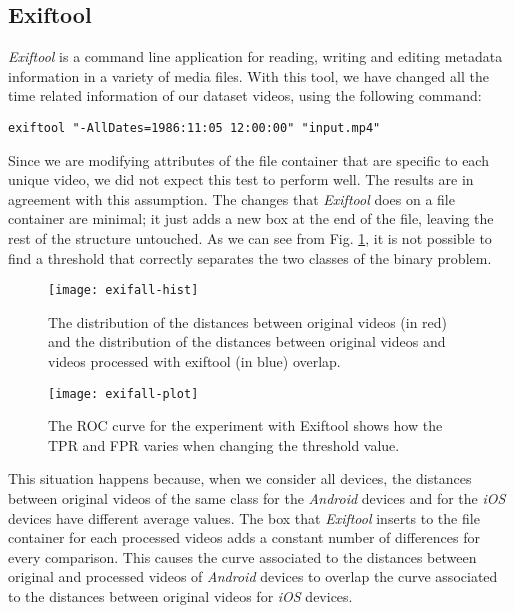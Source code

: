 \subsection{Exiftool}

\emph{Exiftool} is a command line application for reading, writing and editing metadata information in a variety of media files. With this tool, we have changed all the time related information of our dataset videos, using the following command:

\begin{lstlisting}
exiftool "-AllDates=1986:11:05 12:00:00" "input.mp4"
\end{lstlisting}

Since we are modifying attributes of the file container that are specific to each unique video, we did not expect this test to perform well. The results are in agreement with this assumption. The changes that \emph{Exiftool} does on a file container are minimal; it just adds a new box at the end of the file, leaving the rest of the structure untouched. As we can see from Fig. \ref{fig:exifaal-hist}, it is not possible to find a threshold that correctly separates the two classes of the binary problem.

\begin{figure}
  \centering
  \texttt{[image: exifall-hist]}
  \caption{The distribution of the distances between original videos (in red) and the distribution of the distances between original videos and videos processed with exiftool (in blue) overlap.}\label{fig:exifaal-hist}
\end{figure}

\begin{figure}
  \centering
  \texttt{[image: exifall-plot]}
  \caption{The ROC curve for the experiment with Exiftool shows how the TPR and FPR varies when changing the threshold value.}\label{fig:brand-roc}
\end{figure}

This situation happens because, when we consider all devices, the distances between original videos of the same class for the \emph{Android} devices and for the \emph{iOS} devices have different average values. The box that \emph{Exiftool} inserts to the file container for each processed videos adds a constant number of differences for every comparison. This causes the curve associated to the distances between original and processed videos of \emph{Android} devices to overlap the curve associated to the distances between original videos for \emph{iOS} devices.

